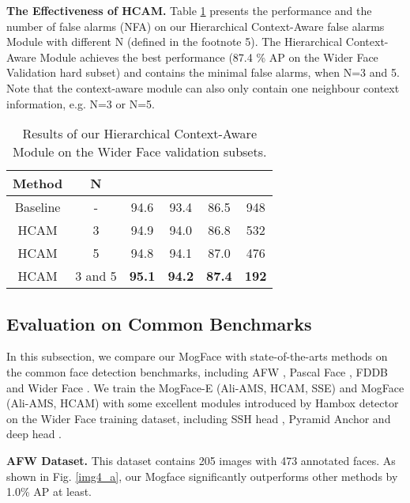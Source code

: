 \documentclass[10pt,twocolumn,letterpaper]{article}
\begin{document}
\noindent\textbf{The Effectiveness of HCAM.} Table \ref{table_8} presents the performance and the number of false alarms (NFA) on our Hierarchical Context-Aware false alarms  Module with different N (defined in the footnote 5). The Hierarchical Context-Aware Module achieves the best performance (87.4 \% AP on the Wider Face Validation hard subset) and contains the minimal false alarms, when N=3 and 5. Note that the  context-aware module can also only contain one neighbour context information, e.g. N=3 or N=5.


\begin{table}[h]
\small
\renewcommand\arraystretch{1.1}
	\begin{center}
	\setlength{\tabcolsep}{6pt}
	\begin{tabular}{c|ccccc}
		\hline
		Method   & N  &  &  &  & \\
		\hline
		Baseline  & - &94.6  &93.4 &86.5 & 948 \\
		HCAM    &3  & 94.9 &94.0 & 86.8 & 532\\
		HCAM    &5  & 94.8 &94.1 & 87.0 & 476\\
		HCAM    &3 and 5 &\textbf{95.1}	& \textbf{94.2}	& \textbf{87.4}  &\textbf{192}\\
		\hline				
	\end{tabular}
	\end{center}
\vspace{-10pt}
\caption{Results of our Hierarchical Context-Aware Module on the Wider Face validation subsets.
}
\label{table_8}
\end{table}

\subsection{Evaluation on Common Benchmarks}

In this subsection, we  compare our MogFace with state-of-the-arts methods on the common face detection benchmarks, including AFW \cite{zhu2012face}, Pascal Face \cite{yan2014face}, FDDB \cite{jain2010fddb} and Wider Face \cite{yang2016wider}. We train the MogFace-E (Ali-AMS, HCAM, SSE) and MogFace (Ali-AMS, HCAM) with some excellent modules introduced by Hambox \cite{liu2019hambox} detector on the  Wider Face training dataset, including SSH head \cite{najibi2017ssh}, Pyramid Anchor \cite{tang2018pyramidbox} and deep head \cite{lin2017focal}. 


\noindent \textbf{AFW Dataset.} This dataset contains 205 images with 473 annotated faces. As shown in Fig. \ref{img4_a},  our Mogface significantly outperforms other methods by 1.0\% AP at least.
\end{document}

